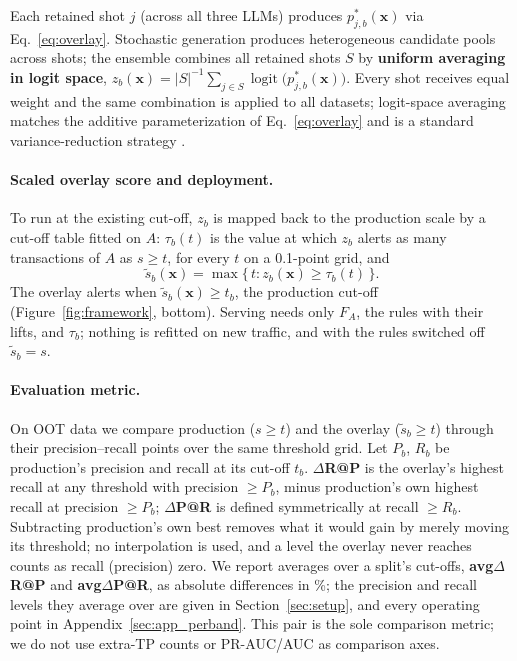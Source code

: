 \documentclass[11pt]{article}
\begin{document}
Each retained shot $j$ (across all three LLMs) produces $p^*_{j,b}(\mathbf{x})$ via
Eq.~\eqref{eq:overlay}. Stochastic generation produces heterogeneous candidate pools across shots;
the ensemble combines all retained shots $S$ by \textbf{uniform averaging in logit space},
$z_b(\mathbf{x}) = |S|^{-1}\sum_{j\in S}\operatorname{logit}\bigl(p^*_{j,b}(\mathbf{x})\bigr)$.
Every shot receives equal weight and the same combination is applied to all datasets;
logit-space averaging matches the additive parameterization of Eq.~\eqref{eq:overlay} and is a
standard variance-reduction strategy \citep{dietterich2000ensemble}.

\paragraph{Scaled overlay score and deployment.}
To run at the existing cut-off, $z_b$ is mapped back to the production scale by a cut-off table
fitted on $A$: $\tau_b(t)$ is the value at which $z_b$ alerts as many transactions of $A$ as
$s\ge t$, for every $t$ on a 0.1-point grid, and
\begin{equation}
  \tilde s_b(\mathbf{x}) = \max\{\,t : z_b(\mathbf{x}) \ge \tau_b(t)\,\}.
  \label{eq:scaled}
\end{equation}
The overlay alerts when $\tilde s_b(\mathbf{x})\ge t_b$, the production cut-off
(Figure~\ref{fig:framework}, bottom). Serving needs only $F_A$, the rules with their lifts, and
$\tau_b$; nothing is refitted on new traffic, and with the rules switched off $\tilde s_b=s$.

\paragraph{Evaluation metric.}
On OOT data we compare production ($s\ge t$) and the overlay ($\tilde s_b\ge t$) through their
precision--recall points over the same threshold grid. Let $P_b$, $R_b$ be production's precision
and recall at its cut-off $t_b$. \textbf{$\Delta$R@P} is the overlay's highest recall at any threshold
with precision $\ge P_b$, minus production's own highest recall at precision $\ge P_b$;
\textbf{$\Delta$P@R} is defined symmetrically at recall $\ge R_b$. Subtracting production's own best
removes what it would gain by merely moving its threshold; no interpolation is used, and a level the
overlay never reaches counts as recall (precision) zero. We report averages over a split's
cut-offs, \textbf{avg$\Delta$R@P} and \textbf{avg$\Delta$P@R}, as absolute differences in \%; the
precision and recall levels they average over are given in Section~\ref{sec:setup}, and every
operating point in Appendix~\ref{sec:app_perband}. This pair is the sole comparison metric; we do
not use extra-TP counts or PR-AUC/AUC as comparison axes.
\end{document}
